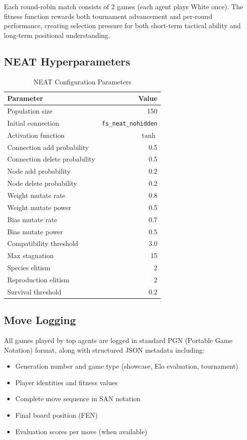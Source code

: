 \documentclass[11pt, twocolumn]{article}
\begin{document}
Each round-robin match consists of 2 games (each agent plays White once). The fitness function rewards both tournament advancement and per-round performance, creating selection pressure for both short-term tactical ability and long-term positional understanding.

\subsection{NEAT Hyperparameters}

\begin{table}[H]
\centering
\caption{NEAT Configuration Parameters}
\label{tab:neat_params}
\small
\begin{tabular}{@{}lr@{}}
\toprule
\textbf{Parameter} & \textbf{Value} \\
\midrule
Population size & 150 \\
Initial connection & \texttt{fs\_neat\_nohidden} \\
Activation function & $\tanh$ \\
Connection add probability & 0.5 \\
Connection delete probability & 0.5 \\
Node add probability & 0.2 \\
Node delete probability & 0.2 \\
Weight mutate rate & 0.8 \\
Weight mutate power & 0.5 \\
Bias mutate rate & 0.7 \\
Bias mutate power & 0.5 \\
Compatibility threshold & 3.0 \\
Max stagnation & 15 \\
Species elitism & 2 \\
Reproduction elitism & 2 \\
Survival threshold & 0.2 \\
\bottomrule
\end{tabular}
\end{table}

\subsection{Move Logging}
All games played by top agents are logged in standard PGN (Portable Game Notation) format, along with structured JSON metadata including:
\begin{itemize}[leftmargin=*, itemsep=1pt]
    \item Generation number and game type (showcase, Elo evaluation, tournament)
    \item Player identities and fitness values
    \item Complete move sequence in SAN notation
    \item Final board position (FEN)
    \item Evaluation scores per move (when available)
\end{itemize}
\end{document}
